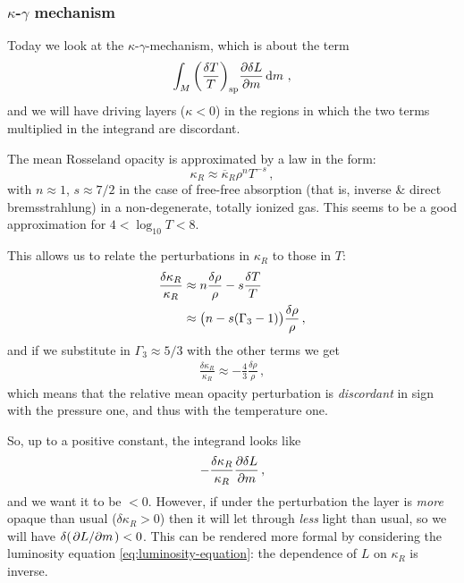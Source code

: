 \documentclass[main.tex]{subfiles}
\begin{document}
\subsubsection{\(\kappa \)-\(\gamma \) mechanism}

Today we look at the \(\kappa \)-\(\gamma \)-mechanism, which is about the term 
%
\begin{equation}
\int_M \qty(\frac{\delta T}{T})_{\text{sp}} \pdv{\delta L}{m} \dd{m} 
\,,
\end{equation}
%
and we will have driving layers (\(\kappa <0\)) in the regions in which the two terms multiplied in the integrand are discordant. 

The mean Rosseland opacity is approximated by a law in the form: 
%
\begin{equation}
  \kappa _R \approx \overline{\kappa }_R \rho^{n} T^{-s} 
\,,
\end{equation}
%
with \(n \approx 1\), \(s \approx 7/2\) in the case of free-free absorption (that is, inverse \& direct bremsstrahlung) in a non-degenerate, totally ionized gas.
This seems to be a good approximation for \(4 < \log_{10}T < 8\). 

This allows us to relate the perturbations in \(\kappa_{R} \) to those in \(T\): 
%
\begin{subequations}
\begin{align}
\frac{ \delta \kappa_R}{ \kappa_R} &\approx
n \frac{ \delta \rho }{\rho } - s \frac{ \delta T}{T}  \\
&\approx \qty(n - s (\Gamma_3 -1)) \frac{ \delta \rho }{\rho }
\,,
\end{align}
\end{subequations}
%
and if we substitute in \(\Gamma_3 \approx 5/3\) with the other terms we get 
%
\begin{align}
\frac{ \delta \kappa_R}{\kappa _R} \approx - \frac{4}{3} \frac{ \delta \rho }{\rho }
\,,
\end{align}
%
which means that the relative mean opacity perturbation is \emph{discordant} in sign with the pressure one, and thus with the temperature one. 

So, up to a positive constant, the integrand looks like 
%
\begin{align}
-\frac{ \delta \kappa _R}{\kappa _R} \pdv{ \delta L}{m}
\,,
\end{align}
%
and we want it to be \(<0\). 
However, if under the perturbation the layer is \emph{more} opaque than usual (\(\delta \kappa _R > 0\)) then it will let through \emph{less} light than usual, so we will have \(\delta (\pdv*{L}{m}) < 0\).
This can be rendered more formal by considering the luminosity equation \eqref{eq:luminosity-equation}: the dependence of \(L\) on \(\kappa_R \) is inverse.
\end{document}
